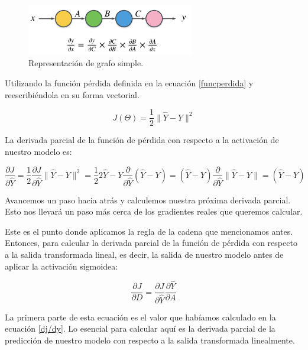 \documentclass[a4paper,12pt]{article}
\begin{document}
\begin{figure}[H]
	\begin{center}				
	\includegraphics[width=0.65\textwidth]{025.png}
  	\caption{Representación de grafo simple.}
  	\label{fig:func}
  	\end{center}
\end{figure}

Utilizando la función pérdida definida en la ecuación \ref{funcperdida} y reescribiéndola en su forma vectorial.

\begin{equation}
J(\Theta)=\frac{1}{2} \|\hat{Y}-Y\|^2
\end{equation}

La derivada parcial de la función de pérdida con respecto a la activación de nuestro modelo es:

\begin{equation}
\frac{\partial J}{\partial \hat{Y}}
=\frac{1}{2} \frac{\partial J}{\partial \hat{Y}} \|\hat{Y}-Y\|^2 = \frac{1}{2} 2 \hat{Y} - Y \frac{\partial}{\partial \hat{Y}} (\hat{Y}-Y) = (\hat{Y}-Y) \frac{\partial}{\partial \hat{Y}} \|\hat{Y}-Y\| = (\hat{Y} - Y)
\label{dj/dy}
\end{equation}

Avancemos un paso hacia atrás y calculemos nuestra próxima derivada parcial. Esto nos llevará un paso más cerca de los gradientes reales que queremos calcular.

Este es el punto donde aplicamos la regla de la cadena que mencionamos antes. Entonces, para calcular la derivada parcial de la función de pérdida con respecto a la salida transformada lineal, es decir, la salida de nuestro modelo antes de aplicar la activación sigmoidea:

\begin{equation}
\frac{\partial J}{\partial D} = \frac{\partial J}{\partial \hat{Y}} \frac{\partial \hat{Y}}{\partial A}
\label{dJdD}
\end{equation}

La primera parte de esta ecuación es el valor que habíamos calculado en la ecuación \ref{dj/dy}. Lo esencial para calcular aquí es la derivada parcial de la predicción de nuestro modelo con respecto a la salida transformada linealmente.
\end{document}
